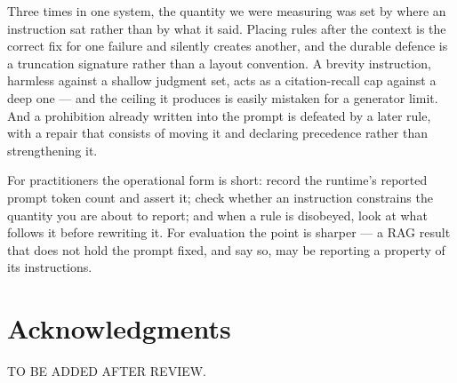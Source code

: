 \documentclass[conference]{IEEEtran}
\begin{document}
Three times in one system, the quantity we were measuring was set by where an
instruction sat rather than by what it said. Placing rules after the context is
the correct fix for one failure and silently creates another, and the durable
defence is a truncation signature rather than a layout convention. A brevity
instruction, harmless against a shallow judgment set, acts as a citation-recall
cap against a deep one --- and the ceiling it produces is easily mistaken for a
generator limit. And a prohibition already written into the prompt is defeated by
a later rule, with a repair that consists of moving it and declaring precedence
rather than strengthening it.

For practitioners the operational form is short: record the runtime's reported
prompt token count and assert it; check whether an instruction constrains the
quantity you are about to report; and when a rule is disobeyed, look at what
follows it before rewriting it. For evaluation the point is sharper --- a RAG
result that does not hold the prompt fixed, and say so, may be reporting a
property of its instructions.

\section*{Acknowledgments}

TO BE ADDED AFTER REVIEW.



\end{document}
